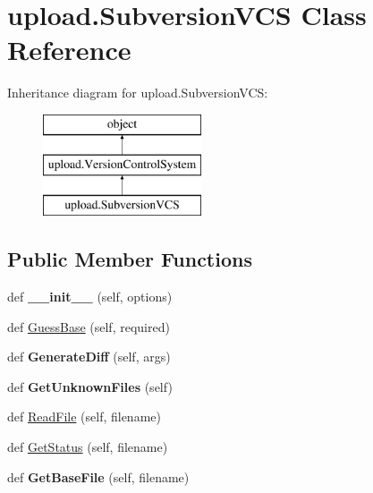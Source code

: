 \hypertarget{classupload_1_1_subversion_v_c_s}{}\section{upload.\+Subversion\+V\+CS Class Reference}
\label{classupload_1_1_subversion_v_c_s}
Inheritance diagram for upload.\+Subversion\+V\+CS\+:\begin{figure}[H]
\begin{center}
\leavevmode
\includegraphics[height=3.000000cm]{classupload_1_1_subversion_v_c_s}
\end{center}
\end{figure}
\subsection*{Public Member Functions}
\begin{DoxyCompactItemize}
\item 
\mbox{\label{classupload_1_1_subversion_v_c_s_a8333f94e27335ce83eed0cc3f5a1eeb0}} 
def {\bfseries \+\_\+\+\_\+init\+\_\+\+\_\+} (self, options)
\item 
def \mbox{\hyperlink{classupload_1_1_subversion_v_c_s_a7d22d459469a757270502ce0dccacbd2}{Guess\+Base}} (self, required)
\item 
\mbox{\label{classupload_1_1_subversion_v_c_s_a07c2d341f2c7df2772dd7f85e89b0212}} 
def {\bfseries Generate\+Diff} (self, args)
\item 
\mbox{\label{classupload_1_1_subversion_v_c_s_a494ba1010992d83cac015bc396ab693a}} 
def {\bfseries Get\+Unknown\+Files} (self)
\item 
def \mbox{\hyperlink{classupload_1_1_subversion_v_c_s_a340d269b74386ac863636f6b0683d9f4}{Read\+File}} (self, filename)
\item 
def \mbox{\hyperlink{classupload_1_1_subversion_v_c_s_ac3785eb1fa561088206d01570f9fe982}{Get\+Status}} (self, filename)
\item 
\mbox{\label{classupload_1_1_subversion_v_c_s_a29dec4941de0824734d6842a2f33ffc3}} 
def {\bfseries Get\+Base\+File} (self, filename)
\end{DoxyCompactItemize}
